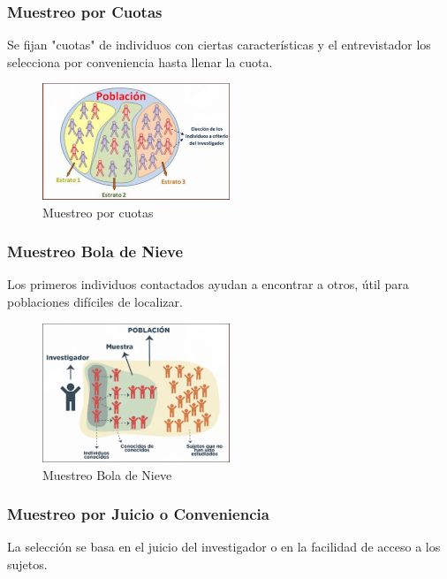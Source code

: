 \documentclass[12pt, letterpaper]{article}
\begin{document}
\subsubsection{Muestreo por Cuotas}
Se fijan "cuotas" de individuos con ciertas características y el entrevistador los selecciona por conveniencia hasta llenar la cuota.

\begin{figure}[htbp]
    \centering
    \includegraphics[width=0.5\textwidth]{MPCU}
    \caption{Muestreo por cuotas}
    \label{fig:MPCU}
\end{figure}

\subsubsection{Muestreo Bola de Nieve}
Los primeros individuos contactados ayudan a encontrar a otros, útil para poblaciones difíciles de localizar.

\begin{figure}[htbp]
    \centering
    \includegraphics[width=0.5\textwidth]{MBN}
    \caption{Muestreo Bola de Nieve}
    \label{fig:MBC}
\end{figure}

\subsubsection{Muestreo por Juicio o Conveniencia}
La selección se basa en el juicio del investigador o en la facilidad de acceso a los sujetos.
\end{document}
